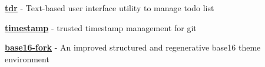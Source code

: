 
\begin{cvparagraph}


\hfill
\begin{cvitems}

\item{\href{https://github.com/Z5483/tdr}{\textbf{tdr}} - Text-based user interface utility to manage todo list}
\item{\href{https://github.com/Z5483/timestamp}{\textbf{timestamp}} - trusted timestamp management for git}
\item{\href{https://github.com/base16-fork}{\textbf{base16-fork}} - An improved structured and regenerative base16 theme environment}

\end{cvitems}

\end{cvparagraph}
